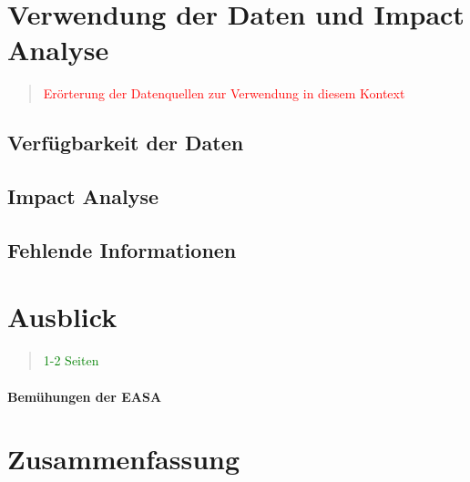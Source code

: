 \chapter{Verwendung der Daten und Impact Analyse}

\begin{quote}
\textcolor{red}{Erörterung der Datenquellen zur Verwendung in diesem Kontext}
\end{quote}

    \section{Verfügbarkeit der Daten}
    \section{Impact Analyse}
    \section{Fehlende Informationen}

\chapter{Ausblick}
\begin{quote}
\textcolor{green}{1-2 Seiten}
\end{quote}

\label{ch:ausblick}

\subsubsection{Bemühungen der EASA}

\chapter{Zusammenfassung}


